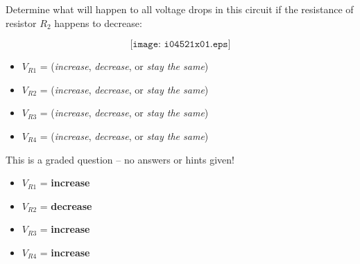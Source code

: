 

Determine what will happen to all voltage drops in this circuit if the resistance of resistor $R_2$ happens to decrease:

$$\texttt{[image: i04521x01.eps]}$$

\begin{itemize}
\item{} $V_{R1}$ = ({\it increase}, {\it decrease}, or {\it stay the same})
\vskip 10pt
\item{} $V_{R2}$ = ({\it increase}, {\it decrease}, or {\it stay the same})
\vskip 10pt
\item{} $V_{R3}$ = ({\it increase}, {\it decrease}, or {\it stay the same})
\vskip 10pt
\item{} $V_{R4}$ = ({\it increase}, {\it decrease}, or {\it stay the same})
\end{itemize}

\vfil 

\eject






This is a graded question -- no answers or hints given!







\begin{itemize}
\item{} $V_{R1}$ = {\bf increase}
\vskip 10pt
\item{} $V_{R2}$ = {\bf decrease}
\vskip 10pt
\item{} $V_{R3}$ = {\bf increase}
\vskip 10pt
\item{} $V_{R4}$ = {\bf increase}
\end{itemize}




